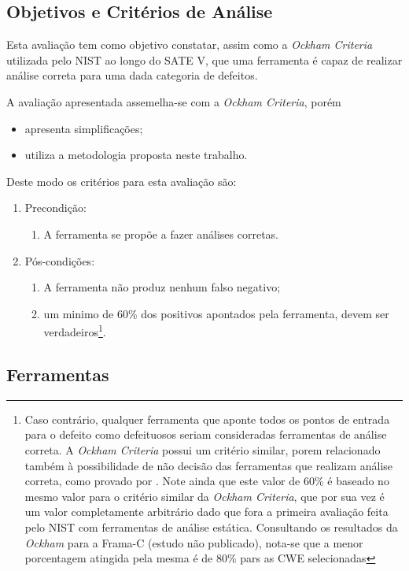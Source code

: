 \subsection{Objetivos e Critérios de Análise}

Esta avaliação tem como objetivo constatar, assim como a \textit{Ockham Criteria} utilizada pelo NIST ao longo do SATE V, que uma ferramenta é capaz de realizar análise correta para uma dada categoria de defeitos.

A avaliação apresentada assemelha-se com a \textit{Ockham Criteria}, porém
\begin{itemize}
  \item apresenta simplificações;
  \item utiliza a metodologia proposta neste trabalho.
\end{itemize}
Deste modo os critérios para esta avaliação são:

\begin{enumerate}
    \item Precondição:
\begin{enumerate}
  \item A ferramenta se propõe a fazer análises corretas.
\end{enumerate}

    \item Pós-condições:
\begin{enumerate}
  \item A ferramenta não produz nenhum falso negativo;
  \item um minimo de 60\% dos positivos apontados pela ferramenta, devem ser verdadeiros\footnote{Caso contrário, qualquer ferramenta que aponte todos os pontos de entrada para o defeito como defeituosos seriam consideradas ferramentas de análise correta. A \textit{Ockham Criteria} possui um critério similar, porem relacionado também à possibilidade de não decisão das ferramentas que realizam análise correta, como provado por \cite{rice}. Note ainda que este valor de 60\% é baseado no mesmo valor para o critério similar da \textit{Ockham Criteria}, que por sua vez é um valor completamente arbitrário dado que fora a primeira avaliação feita pelo NIST com ferramentas de análise estática. Consultando os resultados da \textit{Ockham} para a Frama-C (estudo não publicado), nota-se que a menor porcentagem atingida pela mesma é de 80\% pars as CWE selecionadas}.
\end{enumerate}
\end{enumerate}
\subsection{Ferramentas}


